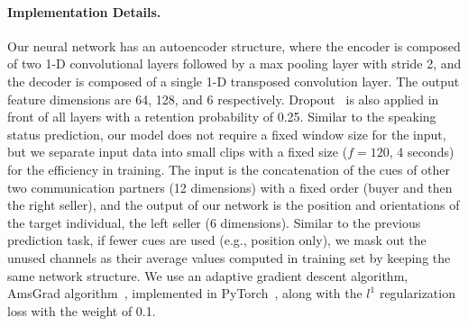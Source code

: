 \paragraph{Implementation Details.}
Our neural network has an autoencoder structure, where the encoder is composed of two 1-D convolutional layers followed by a max pooling layer with stride 2, and the decoder is composed of a single 1-D transposed convolution layer. The output feature dimensions are 64, 128, and 6 respectively. Dropout~\cite{srivastava2014dropout} is also applied in front of all layers with a retention probability of 0.25. Similar to the speaking status prediction, our model does not require a fixed window size for the input, but we separate input data into small clips with a fixed size ($f=120$, 4 seconds) for the efficiency in training. The input is the concatenation of the cues of other two communication partners (12 dimensions) with a fixed order (buyer and then the right seller), and the output of our network is the position and orientations of the target individual, the left seller (6 dimensions). Similar to the previous prediction task, if fewer cues are used (e.g., position only), we mask out the unused channels as their average values computed in training set by keeping the same network structure. We use an adaptive gradient descent algorithm, AmsGrad algorithm~\cite{reddi2018convergence}, implemented in PyTorch~\cite{paszke2017automatic}, along with the $l^1$ regularization loss with the weight of 0.1.

